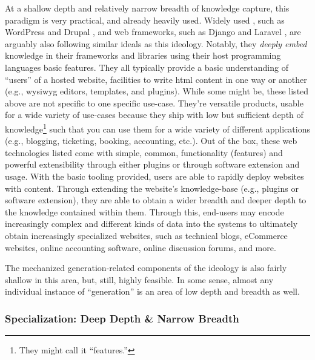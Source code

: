 At a shallow depth and relatively narrow breadth of knowledge capture, this
paradigm is very practical, and already heavily used. Widely used ,
such as WordPress \cite{WordPress} and Drupal \cite{Drupal}, and web frameworks,
such as Django \cite{Django} and Laravel \cite{Laravel}, are arguably also
following similar ideals as this ideology. Notably, they \textit{deeply embed}
\cite{Carette2009} knowledge in their frameworks and libraries using their host
programming languages basic features. They all typically provide a basic
understanding of ``users'' of a hosted website, facilities to write \acs{html}
content in one way or another (e.g., \acs{wysiwyg} editors, templates, and
plugins). While some might be, these listed above are not specific to one
specific use-case. They're versatile products, usable for a wide variety of
use-cases because they ship with low but sufficient depth of
knowledge\footnote{They might call it ``features.''} such that you can use them
for a wide variety of different applications (e.g., blogging, ticketing,
booking, accounting, etc.). Out of the box, these web technologies listed come
with simple, common, functionality (features) and powerful extensibility through
either plugins or through software extension and usage. With the basic tooling
provided, users are able to rapidly deploy websites with content. Through
extending the website's knowledge-base (e.g., plugins or software extension),
they are able to obtain a wider breadth and deeper depth to the knowledge
contained within them. Through this, end-users may encode increasingly complex
and different kinds of data into the systems to ultimately obtain increasingly
specialized websites, such as technical blogs, eCommerce websites, online
accounting software, online discussion forums, and more.

The mechanized generation-related components of the ideology is also fairly
shallow in this area, but, still, highly feasible. In some sense, almost any
individual instance of ``generation'' is an area of low depth and breadth as
well.

\subsubsection{Specialization: Deep Depth \& Narrow Breadth}
\label{chap:ideology:sec:thoughts_of_generation:subsec:feasibility:subsubsec:specialization}

